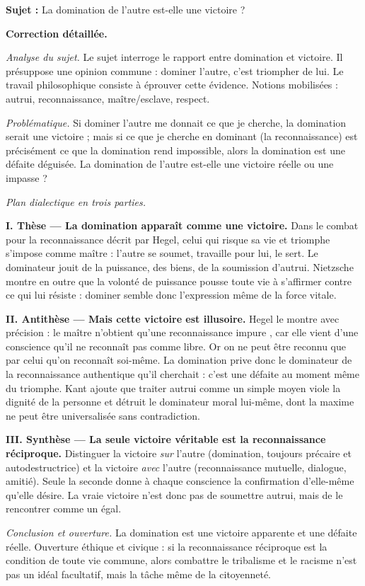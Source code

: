 \documentclass[11pt]{article}
\begin{document}
\begin{exoresolu}
\textbf{Sujet :} \guillemotleft La domination de l'autre est-elle une victoire ? \guillemotright

\tcblower

\textbf{Correction détaillée.}

\emph{Analyse du sujet.} Le sujet interroge le rapport entre domination et victoire. Il présuppose une opinion commune : dominer l'autre, c'est triompher de lui. Le travail philosophique consiste à éprouver cette évidence. Notions mobilisées : autrui, reconnaissance, maître/esclave, respect.

\emph{Problématique.} Si dominer l'autre me donnait ce que je cherche, la domination serait une victoire ; mais si ce que je cherche en dominant (la reconnaissance) est précisément ce que la domination rend impossible, alors la domination est une défaite déguisée. La domination de l'autre est-elle une victoire réelle ou une impasse ?

\emph{Plan dialectique en trois parties.}

\textbf{I. Thèse — La domination apparaît comme une victoire.} Dans le combat pour la reconnaissance décrit par Hegel, celui qui risque sa vie et triomphe s'impose comme maître : l'autre se soumet, travaille pour lui, le sert. Le dominateur jouit de la puissance, des biens, de la soumission d'autrui. Nietzsche montre en outre que la volonté de puissance pousse toute vie à s'affirmer contre ce qui lui résiste : dominer semble donc l'expression même de la force vitale.

\textbf{II. Antithèse — Mais cette victoire est illusoire.} Hegel le montre avec précision : le maître n'obtient qu'une reconnaissance \guillemotleft impure \guillemotright, car elle vient d'une conscience qu'il ne reconnaît pas comme libre. Or on ne peut être reconnu que par celui qu'on reconnaît soi-même. La domination prive donc le dominateur de la reconnaissance authentique qu'il cherchait : c'est une défaite au moment même du triomphe. Kant ajoute que traiter autrui comme un simple moyen viole la dignité de la personne et détruit le dominateur moral lui-même, dont la maxime ne peut être universalisée sans contradiction.

\textbf{III. Synthèse — La seule victoire véritable est la reconnaissance réciproque.} Distinguer la victoire \emph{sur} l'autre (domination, toujours précaire et autodestructrice) et la victoire \emph{avec} l'autre (reconnaissance mutuelle, dialogue, amitié). Seule la seconde donne à chaque conscience la confirmation d'elle-même qu'elle désire. La vraie victoire n'est donc pas de soumettre autrui, mais de le rencontrer comme un égal.

\emph{Conclusion et ouverture.} La domination est une victoire apparente et une défaite réelle. Ouverture éthique et civique : si la reconnaissance réciproque est la condition de toute vie commune, alors combattre le tribalisme et le racisme n'est pas un idéal facultatif, mais la tâche même de la citoyenneté.
\end{exoresolu}
\end{document}
